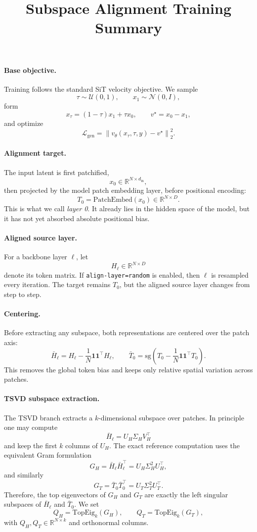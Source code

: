 \documentclass[11pt]{article}
\title{Subspace Alignment Training Summary}
\date{}
\begin{document}
\maketitle

\paragraph{Base objective.}
Training follows the standard SiT velocity objective. We sample
\[
\tau \sim \mathcal{U}(0,1), \qquad x_1 \sim \mathcal{N}(0,I),
\]
form
\[
x_\tau = (1-\tau)x_1 + \tau x_0,
\qquad
v^\star = x_0 - x_1,
\]
and optimize
\[
\mathcal{L}_{\mathrm{gen}} = \left\| v_\theta(x_\tau,\tau,y) - v^\star \right\|_2^2.
\]

\paragraph{Alignment target.}
The input latent is first patchified,
\[
x_0 \in \mathbb{R}^{N \times d_{\mathrm{in}}},
\]
then projected by the model patch embedding layer, before positional encoding:
\[
T_0 = \mathrm{PatchEmbed}(x_0) \in \mathbb{R}^{N \times D}.
\]
This is what we call \emph{layer 0}. It already lies in the hidden space of the model, but it has not yet absorbed absolute positional bias.

\paragraph{Aligned source layer.}
For a backbone layer $\ell$, let
\[
H_\ell \in \mathbb{R}^{N \times D}
\]
denote its token matrix. If \texttt{align-layer=random} is enabled, then $\ell$ is resampled every iteration. The target remains $T_0$, but the aligned source layer changes from step to step.

\paragraph{Centering.}
Before extracting any subspace, both representations are centered over the patch axis:
\[
\bar{H}_\ell = H_\ell - \frac{1}{N}\mathbf{1}\mathbf{1}^\top H_\ell,
\qquad
\bar{T}_0 = \mathrm{sg}\!\left(T_0 - \frac{1}{N}\mathbf{1}\mathbf{1}^\top T_0\right).
\]
This removes the global token bias and keeps only relative spatial variation across patches.

\paragraph{TSVD subspace extraction.}
The TSVD branch extracts a $k$-dimensional subspace over patches. In principle one may compute
\[
\bar{H}_\ell = U_H \Sigma_H V_H^\top
\]
and keep the first $k$ columns of $U_H$. The exact reference computation uses the equivalent Gram formulation
\[
G_H = \bar{H}_\ell \bar{H}_\ell^\top = U_H \Sigma_H^2 U_H^\top,
\]
and similarly
\[
G_T = \bar{T}_0 \bar{T}_0^\top = U_T \Sigma_T^2 U_T^\top.
\]
Therefore, the top eigenvectors of $G_H$ and $G_T$ are exactly the left singular subspaces of $\bar{H}_\ell$ and $\bar{T}_0$. We set
\[
Q_H = \mathrm{TopEig}_k(G_H), \qquad Q_T = \mathrm{TopEig}_k(G_T),
\]
with $Q_H,Q_T \in \mathbb{R}^{N \times k}$ and orthonormal columns.
\end{document}
